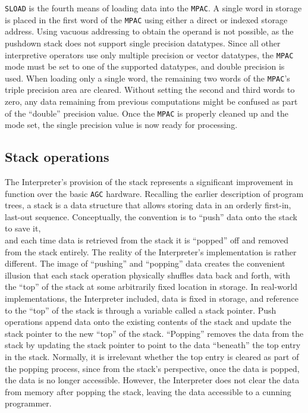 \documentclass[refcap, oxford]{ahsan}
\begin{document}
\texttt{SLOAD} is the fourth means of loading data into the \texttt{MPAC}. A single word in storage is placed in the first word of the \texttt{MPAC} using either a direct or indexed storage address. Using vacuous addressing to obtain the operand is not possible, as the pushdown stack does not support single precision datatypes. Since all other interpretive operators use only multiple precision or vector datatypes, the \texttt{MPAC} mode must be set to one of the supported datatypes, and double precision is used. When loading only a single word, the remaining two words of the \texttt{MPAC}'s triple precision area are cleared. Without setting the second and third words to zero, any data remaining from previous computations might be confused as part of the ``double'' precision value. Once the \texttt{MPAC} is properly cleaned up and the mode set, the single precision value is now ready for processing.


\subsection{Stack operations}
The Interpreter's provision of the stack represents a significant improvement in function over the basic \texttt{AGC} hardware. Recalling the earlier description of program trees, a stack is a data structure that allows storing data in an orderly first-in, last-out sequence. Conceptually, the convention is to ``push'' data onto the stack to save it,\\
and each time data is retrieved from the stack it is ``popped'' off and removed from the stack entirely. The reality of the Interpreter's implementation is rather different. The image of ``pushing'' and ``popping'' data creates the convenient illusion that each stack operation physically shuffles data back and forth, with the ``top'' of the stack at some arbitrarily fixed location in storage. In real-world implementations, the Interpreter included, data is fixed in storage, and reference to the ``top'' of the stack is through a variable called a stack pointer. Push operations append data onto the existing contents of the stack and update the stack pointer to the new ``top'' of the stack. ``Popping'' removes the data from the stack by updating the stack pointer to point to the data ``beneath'' the top entry in the stack. Normally, it is irrelevant whether the top entry is cleared as part of the popping process, since from the stack's perspective, once the data is popped, the data is no longer accessible. However, the Interpreter does not clear the data from memory after popping the stack, leaving the data accessible to a cunning programmer.
\end{document}
